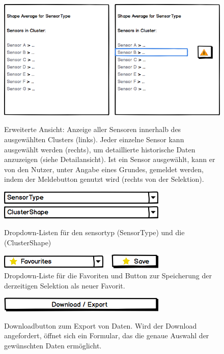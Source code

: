 \begin{figure}[H]
	\centering
		\includegraphics[width=0.8\linewidth]{gui/frontend/FrontGUISensorListAloneAndWithSelection.png}\\
	\caption{Erweiterte Ansicht: Anzeige aller Sensoren innerhalb des ausgewählten Clusters (links). Jeder einzelne Sensor kann ausgewählt werden (rechts), um detaillierte historische Daten anzuzeigen (siehe Detailansicht). Ist ein Sensor ausgewählt, kann er von den Nutzer, unter Angabe eines Grundes, gemeldet werden, indem der Meldebutton genutzt wird (rechts von der Selektion).}
\end{figure}

\begin{figure}[H]
	\centering
	\includegraphics[width=0.4\linewidth]{gui/frontend/FrontGUISensorType.png}
	\hspace{0.1cm}
	\includegraphics[width=0.4\linewidth]{gui/frontend/FrontGUIShapeType.png}
	\caption{Dropdown-Listen für den \gls{sensortyp} (SensorType) und die  (ClusterShape)}
\end{figure}

\begin{figure}[H]
	\centering
	\includegraphics[width=0.4\linewidth]{gui/frontend/FrontGUIFavourites.png}
	\caption{Dropdown-Liste für die Favoriten und Button zur Speicherung der derzeitigen Selektion als neuer Favorit.}
\end{figure}

\begin{figure}[H]
	\centering
	\includegraphics[width=0.4\linewidth]{gui/frontend/FrontGUIDownloadButton.png}\\
	\caption{Downloadbutton zum Export von Daten. Wird der Download angefordert, öffnet sich ein Formular, das die genaue Auswahl der gewünschten Daten ermöglicht.}
\end{figure}

